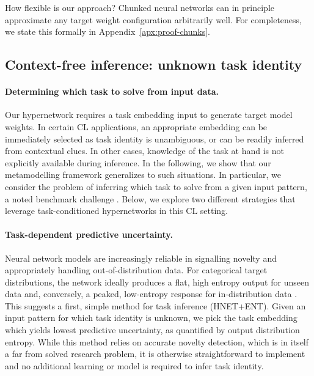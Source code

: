 \documentclass{article}
\begin{document}
How flexible is our approach? Chunked neural networks can in principle approximate any target weight configuration arbitrarily well. For completeness, we state this formally in Appendix~\ref{apx:proof-chunks}.
 
\subsection{Context-free inference: unknown task identity}
\label{sect:rr}
\paragraph{Determining which task to solve from input data.} Our hypernetwork requires a task embedding input to generate target model weights. In certain CL applications, an appropriate embedding can be immediately selected as task identity is unambiguous, or can be readily inferred from contextual clues. In other cases, knowledge of the task at hand is not explicitly available during inference. In the following, we show that our metamodelling framework generalizes to such situations. In particular, we consider the problem of inferring which task to solve from a given input pattern, a noted benchmark challenge \citep{farquhar_towards_2018,van_de_ven_three_2019}. Below, we explore two different strategies that leverage task-conditioned hypernetworks in this CL setting.

\vspace{-2mm}
\paragraph{Task-dependent predictive uncertainty.} Neural network models are increasingly reliable in signalling novelty and appropriately handling out-of-distribution data. For categorical target distributions, the network ideally produces a flat, high entropy output for unseen data and, conversely, a peaked, low-entropy response for in-distribution data \citep{hendrycks2016baseline,liang2017enhancing}. This suggests a first, simple method for task inference (HNET+ENT). Given an input pattern for which task identity is unknown, we pick the task embedding which yields lowest predictive uncertainty, as quantified by output distribution entropy. While this method relies on accurate novelty detection, which is in itself a far from solved research problem, it is otherwise straightforward to implement and no additional learning or model is required to infer task identity.
\end{document}
